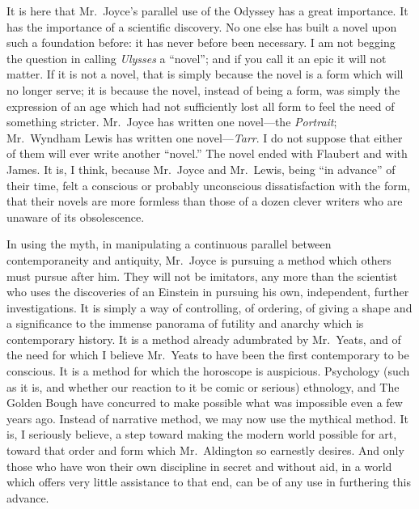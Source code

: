 It is here that Mr.~Joyce's parallel use of the Odyssey has a great
importance. It has the importance of a scientific discovery. No one else
has built a novel upon such a foundation before: it has never before
been necessary. I am not begging the question in calling \emph{Ulysses}
a ``novel''; and if you call it an epic it will not matter. If it is not
a novel, that is simply because the novel is a form which will no longer
serve; it is because the novel, instead of being a form, was simply the
expression of an age which had not sufficiently lost all form to feel
the need of something stricter. Mr.~Joyce has written one novel---the
\emph{Portrait}; Mr.~Wyndham Lewis has written one novel---\emph{Tarr}.
I do not suppose that either of them will ever write another ``novel.''
The novel ended with Flaubert and with James. It is, I think, because
Mr.~Joyce and Mr.~Lewis, being ``in advance'' of their time, felt a
conscious or probably unconscious dissatisfaction with the form, that
their novels are more formless than those of a dozen clever writers who
are unaware of its obsolescence.

In using the myth, in manipulating a continuous parallel between
contemporaneity and antiquity, Mr.~Joyce is pursuing a method which
others must pursue after him. They will not be imitators, any more than
the scientist who uses the discoveries of an Einstein in pursuing his
own, independent, further investigations. It is simply a way of
controlling, of ordering, of giving a shape and a significance to the
immense panorama of futility and anarchy which is contemporary history.
It is a method already adumbrated by Mr.~Yeats, and of the need for
which I believe Mr.~Yeats to have been the first contemporary to be
conscious. It is a method for which the horoscope is auspicious.
Psychology (such as it is, and whether our reaction to it be comic or
serious) ethnology, and The Golden Bough have concurred to make possible
what was impossible even a few years ago. Instead of narrative method,
we may now use the mythical method. It is, I seriously believe, a step
toward making the modern world possible for art, toward that order and
form which Mr.~Aldington so earnestly desires. And only those who have
won their own discipline in secret and without aid, in a world which
offers very little assistance to that end, can be of any use in
furthering this advance.

